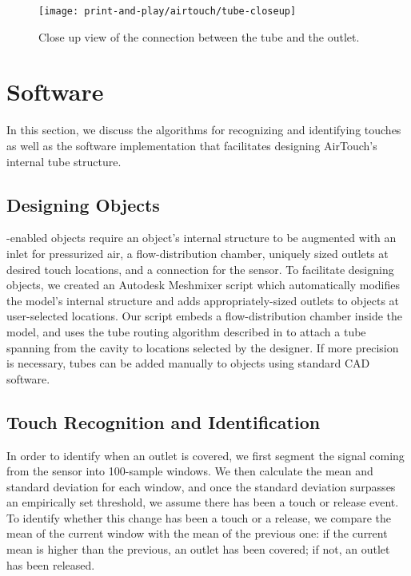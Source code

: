     		\begin{figure}
    			\centering
    			\texttt{[image: print-and-play/airtouch/tube-closeup]}
    			\caption{Close up view of the connection between the tube and the
						outlet.}
    			\label{fig:tube-reduction}
    		\end{figure}

	\section{Software}
		In this section, we discuss the algorithms for recognizing and identifying
		touches as well as the software implementation that facilitates designing
		AirTouch's internal tube structure.

		\subsection{Designing \at Objects}
			\at-enabled objects require an object's internal structure to be augmented
			with an inlet for pressurized air, a flow-distribution chamber, uniquely
			sized outlets at desired touch locations, and a connection for the sensor.
			To facilitate designing \at objects, we created an Autodesk Meshmixer
			script which automatically modifies the model's internal structure and
			adds appropriately-sized outlets to objects at user-selected locations.
			Our script embeds a flow-distribution chamber inside the model, and uses
			the tube routing algorithm described in \cite{Savage:2014} to attach a
			tube spanning from the cavity to locations selected by the designer. If
			more precision is necessary, tubes can be added manually to objects using
			standard CAD software.

		\subsection{Touch Recognition and Identification}
			In order to identify when an outlet is covered, we first segment the
			signal coming from the sensor into 100-sample windows. We then calculate
			the mean and standard deviation for each window, and once the standard
			deviation surpasses an empirically set threshold, we assume there has been
			a touch or release event. To identify whether this change has been a touch
			or a release, we compare the mean of the current window with the mean of
			the previous one: if the current mean is higher than the previous, an
			outlet has been covered; if not, an outlet has been released.
					
